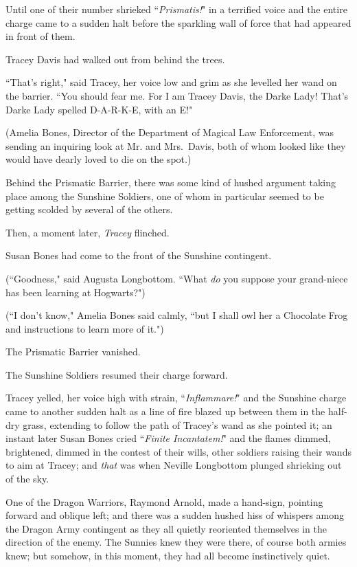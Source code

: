 Until one of their number shrieked ``\emph{Prismatis!}" in a terrified voice and the entire charge came to a sudden halt before the sparkling wall of force that had appeared in front of them.

Tracey Davis had walked out from behind the trees.

``That's right," said Tracey, her voice low and grim as she levelled her wand on the barrier. ``You should fear me. For I am Tracey Davis, the Darke Lady! That's Darke Lady spelled D-A-R-K-E, with an E!"

(Amelia Bones, Director of the Department of Magical Law Enforcement, was sending an inquiring look at Mr. and Mrs.~Davis, both of whom looked like they would have dearly loved to die on the spot.)

Behind the Prismatic Barrier, there was some kind of hushed argument taking place among the Sunshine Soldiers, one of whom in particular seemed to be getting scolded by several of the others.

Then, a moment later, \emph{Tracey} flinched.

Susan Bones had come to the front of the Sunshine contingent.

(``Goodness," said Augusta Longbottom. ``What \emph{do} you suppose your grand-niece has been learning at Hogwarts?")

(``I don't know," Amelia Bones said calmly, ``but I shall owl her a Chocolate Frog and instructions to learn more of it.")

The Prismatic Barrier vanished.

The Sunshine Soldiers resumed their charge forward.

Tracey yelled, her voice high with strain, ``\emph{Inflammare!}" and the Sunshine charge came to another sudden halt as a line of fire blazed up between them in the half-dry grass, extending to follow the path of Tracey's wand as she pointed it; an instant later Susan Bones cried ``\emph{Finite Incantatem!}" and the flames dimmed, brightened, dimmed in the contest of their wills, other soldiers raising their wands to aim at Tracey; and \emph{that} was when Neville Longbottom plunged shrieking out of the sky.

\later

One of the Dragon Warriors, Raymond Arnold, made a hand-sign, pointing forward and oblique left; and there was a sudden hushed hiss of whispers among the Dragon Army contingent as they all quietly reoriented themselves in the direction of the enemy. The Sunnies knew they were there, of course both armies knew; but somehow, in this moment, they had all become instinctively quiet.

